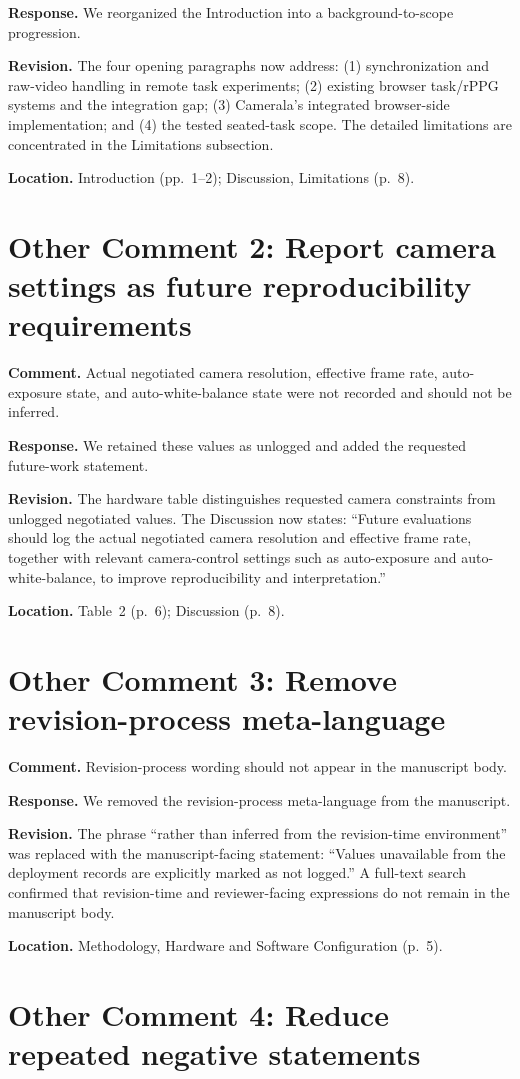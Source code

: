 \documentclass[11pt]{article}
\newcommand{\responseitem}[2]{\section*{#1: #2}}
\begin{document}
\textbf{Response.}
We reorganized the Introduction into a background-to-scope progression.

\textbf{Revision.}
The four opening paragraphs now address: (1) synchronization and raw-video handling in remote task experiments; (2) existing browser task/rPPG systems and the integration gap; (3) Camerala's integrated browser-side implementation; and (4) the tested seated-task scope.
The detailed limitations are concentrated in the Limitations subsection.

\textbf{Location.}
Introduction (pp.~1--2); Discussion, Limitations (p.~8).

\responseitem{Other Comment 2}{Report camera settings as future reproducibility requirements}

\textbf{Comment.}
Actual negotiated camera resolution, effective frame rate, auto-exposure state, and auto-white-balance state were not recorded and should not be inferred.

\textbf{Response.}
We retained these values as unlogged and added the requested future-work statement.

\textbf{Revision.}
The hardware table distinguishes requested camera constraints from unlogged negotiated values.
The Discussion now states: ``Future evaluations should log the actual negotiated camera resolution and effective frame rate, together with relevant camera-control settings such as auto-exposure and auto-white-balance, to improve reproducibility and interpretation.''

\textbf{Location.}
Table~2 (p.~6); Discussion (p.~8).

\responseitem{Other Comment 3}{Remove revision-process meta-language}

\textbf{Comment.}
Revision-process wording should not appear in the manuscript body.

\textbf{Response.}
We removed the revision-process meta-language from the manuscript.

\textbf{Revision.}
The phrase ``rather than inferred from the revision-time environment'' was replaced with the manuscript-facing statement: ``Values unavailable from the deployment records are explicitly marked as not logged.''
A full-text search confirmed that revision-time and reviewer-facing expressions do not remain in the manuscript body.

\textbf{Location.}
Methodology, Hardware and Software Configuration (p.~5).

\responseitem{Other Comment 4}{Reduce repeated negative statements}
\end{document}
